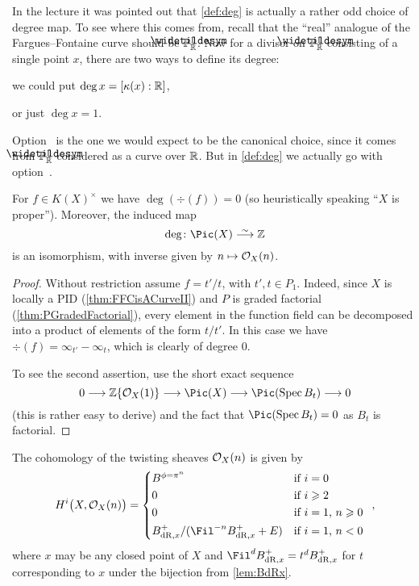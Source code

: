 \begin{rem}
	In the lecture it was pointed out that \cref{def:deg} is actually a rather odd choice of degree map. To see where this comes from, recall that the \enquote{real} analogue of the Fargues--Fontaine curve should be $\snake{\IP}_{\IR}^1$. Now for a divisor on $\snake{\IP}_{\IR}^1$ consisting of a single point $x$, there are two ways to define its degree:
	\begin{numerate}
		\item we could put $\deg x=[\kappa(x):\mathbb{R}]$,
		\item or just $\deg x=1$.
	\end{numerate}
	Option~ is the one we would expect to be the canonical choice, since it comes from $\snake{\IP}_{\IR}^1$ considered as a curve over $\mathbb{R}$. But in \cref{def:deg} we actually go with option~.
\end{rem}
\begin{prop}\label{prop:PicX=Z}
	For $f\in K(X)^\times$ we have $\deg(\div(f))=0$ (so heuristically speaking \enquote{$X$ is proper}). Moreover, the induced map
	\begin{equation*}
		\deg\colon \Pic(X)\isomorphism \IZ
	\end{equation*}
	is an isomorphism, with inverse given by $n\mapsto \mathcal{O}_X(n)$.
\end{prop}
\begin{proof}
	Without restriction assume $f=t'/t$, with $t',t\in P_1$. Indeed, since $X$ is locally a PID (\cref{thm:FFCisACurveII}) and $P$ is graded factorial (\cref{thm:PGradedFactorial}), every element in the function field can be decomposed into a product of elements of the form $t/t'$. In this case we have $\div(f)=\infty_{t'}-\infty_t$, which is clearly of degree $0$.
	
	To see the second assertion, use the short exact sequence
	\begin{equation*}
		0\morphism \IZ\{\Oo_X(1)\}\morphism \Pic(X)\morphism \Pic(\Spec B_t)\morphism 0
	\end{equation*}
	(this is rather easy to derive) and the fact that $\Pic(\Spec B_t)=0$ as $B_t$ is factorial.
\end{proof}
\begin{prop}
	The cohomology of the twisting sheaves $\mathcal{O}_X(n)$ is given by
	\begin{equation*}
		H^i\big(X,\Oo_X(n)\big)=\begin{cases*}
		B^{\phi=\pi^n} & if $i=0$\\
		0 & if $i\geq 2$\\
		0 & if $i=1$, $n\geq 0$\\
		B_{\dR,x}^+/(\Fil^{-n}B_{\dR,x}^++E) & if $i=1$, $n<0$
		\end{cases*}\,,
	\end{equation*}
	where $x$ may be any closed point of $X$ and $\Fil^dB_{\dR,x}^+=t^dB_{\dR,x}^+$ for $t$ corresponding to $x$ under the bijection from \cref{lem:BdRx}.
\end{prop}
